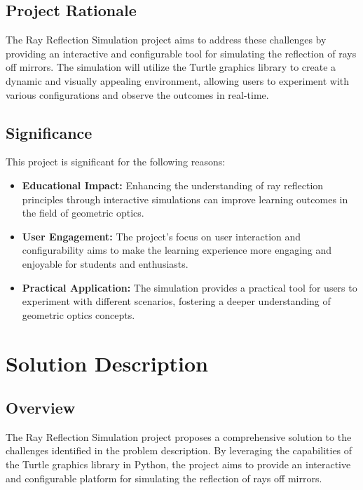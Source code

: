 \documentclass{article}
\begin{document}
\subsection{Project Rationale}
The Ray Reflection Simulation project aims to address these challenges by providing an interactive and configurable tool for simulating the reflection of rays off mirrors. The simulation will utilize the Turtle graphics library to create a dynamic and visually appealing environment, allowing users to experiment with various configurations and observe the outcomes in real-time.

\subsection{Significance}
This project is significant for the following reasons:

\begin{itemize}
    \item \textbf{Educational Impact:} Enhancing the understanding of ray reflection principles through interactive simulations can improve learning outcomes in the field of geometric optics.
    
    \item \textbf{User Engagement:} The project's focus on user interaction and configurability aims to make the learning experience more engaging and enjoyable for students and enthusiasts.
    
    \item \textbf{Practical Application:} The simulation provides a practical tool for users to experiment with different scenarios, fostering a deeper understanding of geometric optics concepts.
\end{itemize}

\section{Solution Description}

\subsection{Overview}
The Ray Reflection Simulation project proposes a comprehensive solution to the challenges identified in the problem description. By leveraging the capabilities of the Turtle graphics library in Python, the project aims to provide an interactive and configurable platform for simulating the reflection of rays off mirrors.
\end{document}
